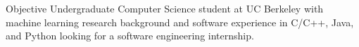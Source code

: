 \begin{rSection}{Objective}
Undergraduate Computer Science student at UC Berkeley with machine learning research background and software experience in C/C++, Java, and Python looking for a software engineering internship.
\end{rSection}
